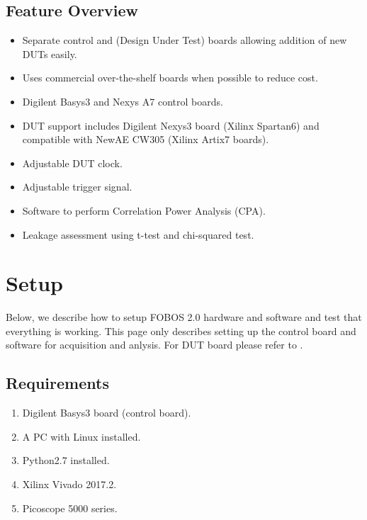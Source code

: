 \documentclass[letterpaper,10pt,english]{sphinxmanual}
\begin{document}
\section{Feature Overview}
\label{\detokenize{introduction:feature-overview}}\begin{itemize}
\item {} 
Separate control and (Design Under Test) boards allowing addition of new DUTs easily.

\item {} 
Uses commercial over-the-shelf boards when possible to reduce cost.

\item {} 
Digilent Basys3 and Nexys A7 control boards.

\item {} 
DUT support includes Digilent Nexys3 board (Xilinx Spartan6) and compatible with NewAE CW305
(Xilinx Artix7 boards).

\item {} 
Adjustable DUT clock.

\item {} 
Adjustable trigger signal.

\item {} 
Software to perform Correlation Power Analysis (CPA).

\item {} 
Leakage assessment using t-test and chi-squared test.

\end{itemize}


\chapter{Setup}
\label{\detokenize{setup:setup}}\label{\detokenize{setup::doc}}
Below, we describe how to setup FOBOS 2.0 hardware and software and test that everything is working.
This page only describes setting up the control board and software for acquisition and anlysis.
For DUT board please refer to {\hyperref[\detokenize{dut_board_setup:dut-board-setup-label}]{}}.


\section{Requirements}
\label{\detokenize{setup:requirements}}\begin{enumerate}
%
\item {} 
Digilent Basys3 board (control board).

\item {} 
A PC with Linux installed.

\item {} 
Python2.7 installed.

\item {} 
Xilinx Vivado 2017.2.

\item {} 
Picoscope 5000 series.

\end{enumerate}
\end{document}

